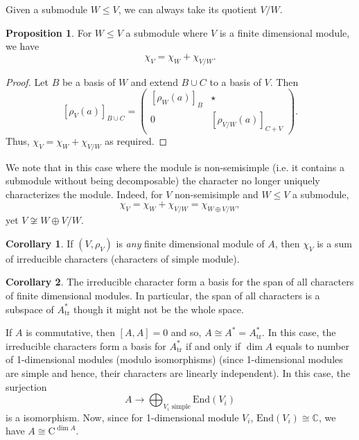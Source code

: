 \documentclass[]{article}
\theoremstyle{definition}
\newtheorem{corollary}{Corollary}[theorem]
\theoremstyle{definition}
\newtheorem{proposition}{Proposition}[section]
\begin{document}
Given a submodule \(W \le V\), we can always take its quotient \(V / W\). 

\begin{proposition}
  For \(W \le V\) a submodule where \(V\) is a finite dimensional module,
  we have 
  \[\chi_V = \chi_W + \chi_{V / W}.\]
\end{proposition}
\begin{proof}
  Let \(B\) be a basis of \(W\) and extend \(B \cup C\) to a basis of \(V\). 
  Then 
  \[[\rho_V(a)]_{B \cup C} = \begin{pmatrix}
    [\rho_W(a)]_{B} & \star\\
    0 & [\rho_{V / W}(a)]_{C + V}
  \end{pmatrix}.\]
  Thus, \(\chi_V = \chi_W + \chi_{V / W}\) as required.
\end{proof}

We note that in this case where the module is non-semisimple (i.e. it contains 
a submodule without being decomposable) the character no longer uniquely 
characterizes the module. Indeed, for \(V\) non-semisimple and \(W \le V\) a 
submodule,
\[\chi_V = \chi_W + \chi_{V / W} = \chi_{W \oplus V / W},\]
yet \(V \not\cong W \oplus V / W\).

\begin{corollary}
  If \((V, \rho_V)\) is \textit{any} finite dimensional module of \(A\), 
  then \(\chi_V\) is a sum of irreducible characters (characters of simple 
  module).
\end{corollary}

\begin{corollary}
  The irreducible character form a basis for the span of all characters 
  of finite dimensional modules. In particular, the span of all characters 
  is a subspace of \(A^*_{\text{tr}}\) though it might not be the whole space.
\end{corollary}

If \(A\) is commutative, then \([A, A] = 0\) and so, \(A \cong A^* = A^*_{\text{tr}}\).
In this case, the irreducible characters form a basis for \(A^*_{\text{tr}}\) 
if and only if \(\dim A\) equals to number of 1-dimensional modules (modulo 
isomorphisms) (since 1-dimensional modules are simple and hence, their characters 
are linearly independent). In this case, the surjection 
\[A \to \bigoplus_{V_i \text{ simple}} \text{End}(V_i)\]
is a isomorphism. Now, since for 1-dimensional module \(V_i\), 
\(\text{End}(V_i) \cong \mathbb{C}\), we have 
\(A \cong \mbox{C}^{\dim A}\).
\end{document}

